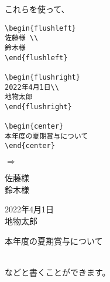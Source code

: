 これらを使って、\\
\begin{minipage}[c]{.50\textwidth}
\begin{screen}
 \small
\begin{verbatim}
\begin{flushleft}
佐藤様 \\
鈴木様
\end{flushleft}

\begin{flushright}
2022年4月1日\\
地物太郎
\end{flushright}

\begin{center}
本年度の夏期賞与について
\end{center}
\end{verbatim}
\end{screen}
\end{minipage}%
$\Rightarrow$
\begin{minipage}{.45\textwidth}
\begin{shadebox}
\begin{flushleft}
佐藤様 \\
鈴木様
\end{flushleft}

\begin{flushright}
2022年4月1日\\
地物太郎
\end{flushright}

\begin{center}
本年度の夏期賞与について
\end{center}

\end{shadebox}
\end{minipage}
\vspace*{1mm}\\
などと書くことができます。

